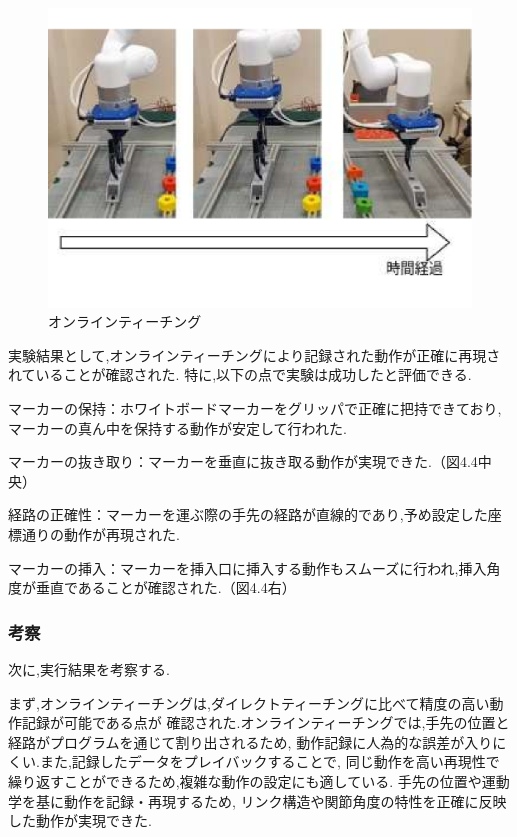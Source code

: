 \begin{figure}[h]
  \centering
  \includegraphics[scale=0.3]{sozai/6.pdf}
  \caption{オンラインティーチング}
\end{figure}

実験結果として,オンラインティーチングにより記録された動作が正確に再現されていることが確認された.
特に,以下の点で実験は成功したと評価できる.

マーカーの保持：ホワイトボードマーカーをグリッパで正確に把持できており,マーカーの真ん中を保持する動作が安定して行われた.

マーカーの抜き取り：マーカーを垂直に抜き取る動作が実現できた.（図4.4中央）

経路の正確性：マーカーを運ぶ際の手先の経路が直線的であり,予め設定した座標通りの動作が再現された.

マーカーの挿入：マーカーを挿入口に挿入する動作もスムーズに行われ,挿入角度が垂直であることが確認された.（図4.4右）

\subsubsection{考察}
次に,実行結果を考察する.

まず,オンラインティーチングは,ダイレクトティーチングに比べて精度の高い動作記録が可能である点が
確認された.オンラインティーチングでは,手先の位置と経路がプログラムを通じて割り出されるため,
動作記録に人為的な誤差が入りにくい.また,記録したデータをプレイバックすることで,
同じ動作を高い再現性で繰り返すことができるため,複雑な動作の設定にも適している.
手先の位置や運動学を基に動作を記録・再現するため,
リンク構造や関節角度の特性を正確に反映した動作が実現できた.

